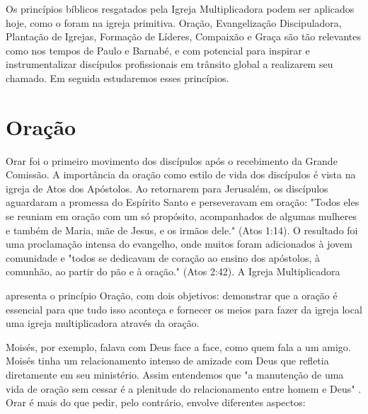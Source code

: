 \documentclass[12pt]{abntex2}
\begin{document}
Os princípios bíblicos resgatados pela Igreja Multiplicadora podem ser aplicados hoje, como o foram na igreja primitiva. Oração, Evangelização Discipuladora, Plantação de Igrejas, Formação de Líderes, Compaixão e Graça são tão relevantes como nos tempos de Paulo e Barnabé, e com potencial para inspirar e instrumentalizar discípulos profissionais em trânsito global a realizarem seu chamado. Em seguida estudaremos esses princípios.


\section{Oração}

Orar foi o primeiro movimento dos discípulos após o recebimento da Grande Comissão\cite[p. 28]{brandao}. A importância da oração como estilo de vida dos discípulos é vista na igreja de Atos dos Apóstolos. Ao retornarem para Jerusalém, os discípulos aguardaram a promessa do Espírito Santo e perseveravam em oração: "Todos eles se reuniam em oração com um só propósito, acompanhados de algumas mulheres e também de Maria, mãe de Jesus, e os irmãos dele." (Atos 1:14). O resultado foi uma proclamação intensa do evangelho, onde muitos foram adicionados à jovem comunidade e "todos se dedicavam de coração ao ensino dos apóstolos, à comunhão, ao partir do pão e à oração." (Atos 2:42). A Igreja Multiplicadora 

\begin{citacao}apresenta o princípio Oração, com dois objetivos: demonstrar que a oração é essencial para que tudo isso aconteça e fornecer os meios para fazer da igreja local uma igreja multiplicadora através da oração\cite[p. 29]{brandao}. \end{citacao}

Moisés, por exemplo, falava com Deus face a face, como quem fala a um amigo. Moisés tinha um relacionamento intenso de amizade com Deus que refletia diretamente em seu ministério. Assim entendemos que "a manutenção de uma vida de oração sem cessar é a plenitude do relacionamento entre homem e Deus" \cite[p. 30]{brandao}. Orar é mais do que pedir, pelo contrário, envolve diferentes aspectos:
\end{document}
